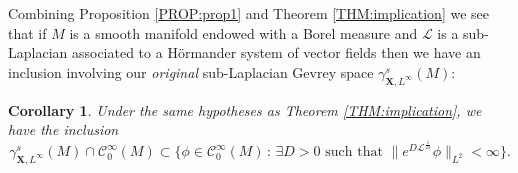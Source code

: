 \documentclass[12pt,oneside,a4paper]{book}
\numberwithin{equation}{section}     %
\theoremstyle{plain}
\newtheorem{corollary}[theorem]{Corollary}
\theoremstyle{definition}
\newcommand{\slp}{{\mathcal L}}
\begin{document}
Combining Proposition \ref{PROP:prop1} and Theorem \ref{THM:implication} we see that if $M$ is a smooth manifold endowed with a Borel measure and $\slp$ is a sub-Laplacian associated to a H\"ormander system of vector fields then we have an inclusion involving our \textit{original} sub-Laplacian Gevrey space $\gamma^s_{\mathbf{X},L^{\infty}}(M)$:
\begin{corollary}\label{COR:implication}
	Under the same hypotheses as Theorem \ref{THM:implication}, we have the inclusion
	\begin{equation*}
	\gamma^s_{\mathbf{X},L^{\infty}}(M)\cap \mathcal C_0^\infty(M)\subset\big\{\phi\in\mathcal C_0^\infty(M)\,:\,\exists D>0\text{ such that }\|e^{D\slp^{\frac{1}{2s}}}\phi\|_{L^2}<\infty\big\}.
	\end{equation*}
\end{corollary}
\end{document}
